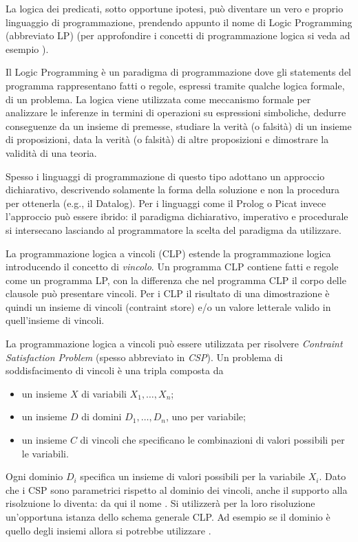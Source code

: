 \documentclass[12pt,a4paper,openright]{book}  %
\begin{document}
La logica dei predicati, sotto opportune ipotesi, può diventare un
vero e proprio linguaggio di programmazione, prendendo appunto il nome
di Logic Programming (abbreviato LP) (per approfondire i concetti di
programmazione logica si veda ad esempio \cite{Console97}).

Il Logic Programming è un paradigma di programmazione dove gli
statements del programma rappresentano fatti o regole, espressi
tramite qualche logica formale, di un problema. La logica viene
utilizzata come meccanismo formale per analizzare le inferenze in
termini di operazioni su espressioni simboliche, dedurre conseguenze
da un insieme di premesse, studiare la verità (o falsità) di un
insieme di proposizioni, data la verità (o falsità) di altre
proposizioni e dimostrare la validità di una teoria.

Spesso i linguaggi di programmazione di questo tipo adottano un
approccio dichiarativo, descrivendo solamente la forma della soluzione
e non la procedura per ottenerla (e.g., il Datalog). Per i linguaggi
come il Prolog o Picat invece l'approccio può essere ibrido: il
paradigma dichiarativo, imperativo e procedurale si intersecano
lasciando al programmatore la scelta del paradigma da utilizzare.

La programmazione logica a vincoli (CLP) estende la programmazione
logica introducendo il concetto di \emph{vincolo}. Un programma CLP
contiene fatti e regole come un programma LP, con la differenza che
nel programma CLP il corpo delle clausole può presentare vincoli. Per
i CLP il risultato di una dimostrazione è quindi un insieme di vincoli
(contraint store) e/o un valore letterale valido in quell'insieme di
vincoli.

La programmazione logica a vincoli può essere utilizzata per risolvere
\emph{Contraint Satisfaction Problem} (spesso abbreviato in
\emph{CSP}). Un problema di soddisfacimento di vincoli è una tripla
composta da
\begin{itemize}
	\item un insieme $X$ di variabili ${X_1, \ldots, X_n}$;
	\item un insieme $D$ di domini ${D_1, \ldots, D_n}$, uno per
          variabile;
	\item un insieme $C$ di vincoli che specificano le
          combinazioni di valori possibili per le variabili.
\end{itemize}

Ogni dominio $D_i$ specifica un insieme di valori possibili per la
variabile $X_i$. Dato che i CSP sono parametrici rispetto al dominio
dei vincoli, anche il supporto alla risolzuione lo diventa: da qui il
nome \clpset{}. Si utilizzerà per la loro risoluzione un’opportuna
istanza dello schema generale CLP. Ad esempio se il dominio è quello
degli insiemi allora si potrebbe utilizzare \clpset{}.
\end{document}
